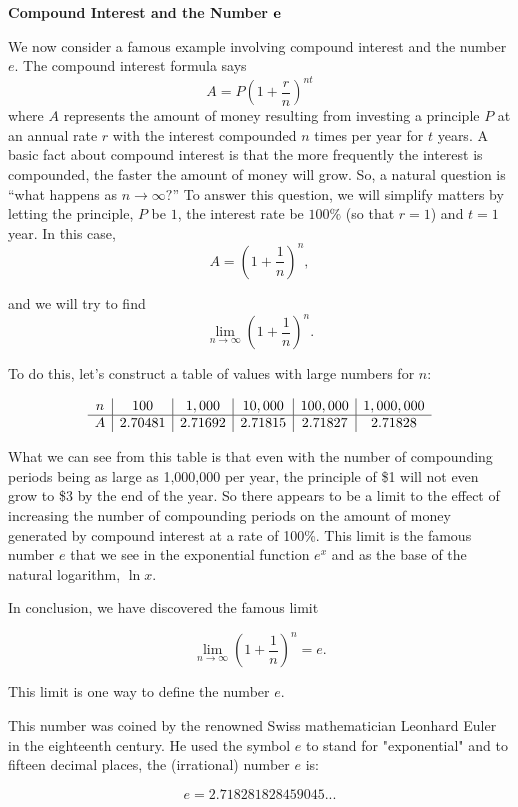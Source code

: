 \documentclass{ximera}
\begin{document}
\begin{center}
{\bf Compound Interest and the Number ${\bf e}$}
\end{center}
\begin{example}[example 10]
We now consider a famous example involving compound interest and the number $e$.
The compound interest formula says 
\[ A = P\left(1+\frac{r}{n}\right)^{nt} \]
where $A$ represents the amount of money resulting from investing a principle $P$ at an annual rate $r$ with 
the interest compounded $n$ times per year for $t$ years.  A basic fact about compound interest is that the more frequently 
the interest is compounded, the faster the amount of money will grow. 
So, a natural question is ``what happens as $n \to \infty?$''
To answer this question, we will simplify matters by letting the principle, $P$ be $1$, the interest rate be $100\%$
(so that $r = 1$) and $t = 1$ year. In this case, 
\[A = \left(1+\frac{1}{n}\right)^n,\]

and we will try to find
\[\lim_{n \to \infty} \left(1+\frac{1}{n}\right)^n.\]

To do this, let's construct a table of values with large numbers for $n$:


\[
\begin{array}{ c | c | c | c | c|c}
  n & 100 & 1,000 & 10,000 & 100,000 & 1,000,000\\ 
	\hline
	A & 2.70481 & 2.71692 & 2.71815 & 2.71827 & 2.71828
	\end{array}
\] 

What we can see from this table is that even with the number of compounding periods being as large as 1,000,000 per year, 
the principle of \$1 will not even grow to \$3 by the end of the year.  So there appears to be a limit to the effect of increasing the 
number of compounding periods on the amount of money generated by compound interest at a rate of 100\%. 
This limit is the famous number $e$ that we see in the exponential function $e^x$ and as the base of the natural logarithm, $\ln x$.

In conclusion, we have discovered the famous limit

\[\lim_{n \to \infty} \left(1+\frac{1}{n}\right)^n = e.\]

This limit is one way to define the number $e$.

This number was coined by the renowned Swiss mathematician Leonhard Euler in the eighteenth century. 
He used the symbol $e$ to stand for "exponential" and to fifteen decimal places, the (irrational) number $e$ is:

\[ e = 2.718281828459045... \]

\end{example}
\end{document}
